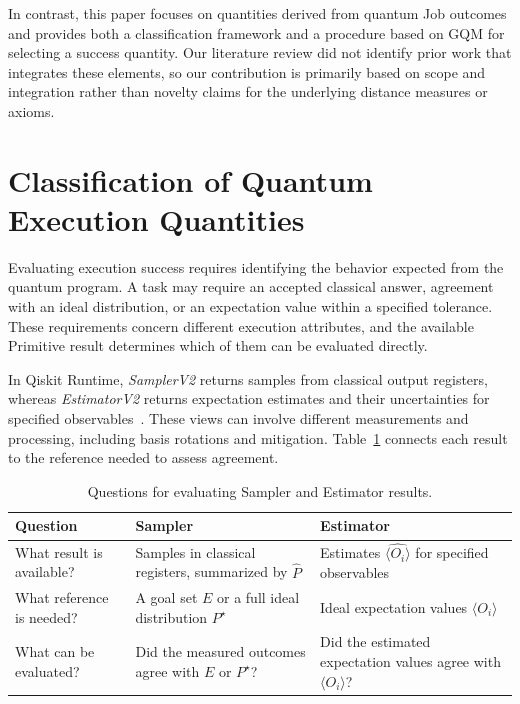 \documentclass[10pt,conference]{IEEEtran}
\begin{document}
In contrast, this paper focuses on quantities derived from quantum Job outcomes and provides both a classification framework and a procedure based on GQM for selecting a success quantity. Our literature review did not identify prior work that integrates these elements, so our contribution is primarily based on scope and integration rather than novelty claims for the underlying distance measures or axioms.

\section{Classification of Quantum Execution Quantities}
\label{sec:model}

Evaluating execution success requires identifying the behavior expected from the quantum program. A task may require an accepted classical answer, agreement with an ideal distribution, or an expectation value within a specified tolerance. These requirements concern different execution attributes, and the available Primitive result determines which of them can be evaluated directly.

In Qiskit Runtime, \emph{SamplerV2} returns samples from classical output registers, whereas \emph{EstimatorV2} returns expectation estimates and their uncertainties for specified observables~\cite{qiskit2024,ibmEstimator2026}. These views can involve different measurements and processing, including basis rotations and mitigation. Table~\ref{tab:primitives} connects each result to the reference needed to assess agreement.

\begin{table}[ht]
\centering
\caption{Questions for evaluating Sampler and Estimator results.}
\label{tab:primitives}
\renewcommand{\arraystretch}{1.15}
\begin{tabularx}{\columnwidth}{@{}>{\raggedright\arraybackslash}p{}>{\raggedright\arraybackslash}X>{\raggedright\arraybackslash}X@{}}
\toprule
\textbf{Question} & \textbf{Sampler} & \textbf{Estimator} \\
\midrule
What result is available? & Samples in classical registers, summarized by $\hat{P}$
& Estimates $\widehat{\langle O_{i}\rangle}$ for specified observables \\
What reference is needed? & A goal set $E$ or a full ideal distribution $P^{\star}$
& Ideal expectation values $\langle O_i\rangle$ \\
What can be evaluated? & Did the measured outcomes agree with $E$ or $P^{\star}$?
& Did the estimated expectation values agree with $\langle O_i\rangle$? \\
\bottomrule
\end{tabularx}
\end{table}
\end{document}
